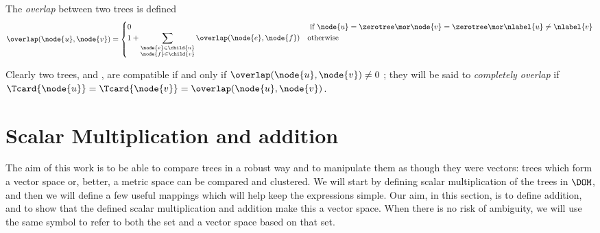 \begin{definition}
The \emph{overlap} between two trees is defined
\[
  \overlap(\node{u},\node{v}) = \begin{cases}
    0 & \text{ if } \node{u} = \zerotree \mor \node{v} = \zerotree \mor \nlabel{u} \neq \nlabel{v} \\
    1 + \displaystyle\sum_{\substack{\node{e}\in\child{u} \\ \node{f}\in\child{v}}} \overlap(\node{e},\node{f}) & \text{otherwise}
  \end{cases}
\]

Clearly two trees,  and , are compatible if and only if \(\overlap(\node{u},\node{v}) \neq 0 \) ; they will
be said to \emph{completely overlap} if \(\Tcard{\node{u}} = \Tcard{\node{v}} =
\overlap(\node{u},\node{v})\).
\end{definition}


    


\section{Scalar Multiplication and addition}

The aim of this work is to be able to compare trees in a robust way
and to manipulate them as though they were vectors: trees which form
a vector space or, better, a metric space can be compared and
clustered. We will start by defining scalar multiplication of the trees in
$\DOM$, and then we will define a few useful mappings which will help
keep the expressions simple. Our aim, in this section, is to define
addition, and to show that the defined scalar multiplication and
addition make this a vector space. When there is no risk of ambiguity,
we will use the same symbol to refer to both the set and
a vector space based on that set.

